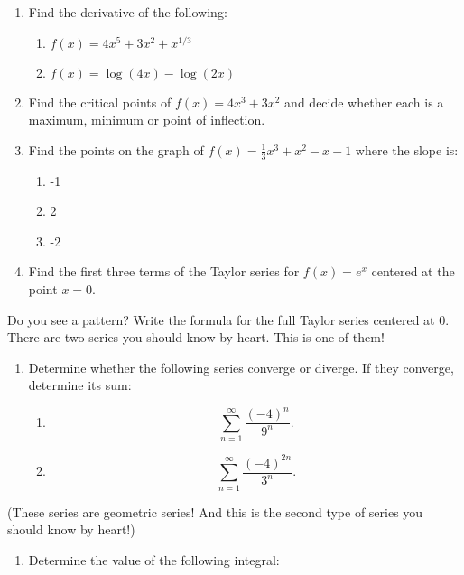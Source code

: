 \documentclass[
]{article}
\providecommand{\tightlist}{%
  \setlength{\itemsep}{0pt}\setlength{\parskip}{0pt}}
\begin{document}
\begin{enumerate}
\def\labelenumi{\arabic{enumi}.}
\item
  Find the derivative of the following:

  \begin{enumerate}
  \def\labelenumii{\alph{enumii}.}
  \tightlist
  \item
    \(f(x) = 4 x^5 + 3 x^2 + x^{1/3}\)
  \item
    \(f(x) = \log(4x) - \log(2x)\)
  \end{enumerate}
\item
  Find the critical points of \(f(x) = 4 x^3 + 3 x^2\) and decide whether each is a maximum, minimum or point of inflection.
\item
  Find the points on the graph of \(f(x) = \frac{1}{3} x^3 + x^2 - x - 1\) where the slope is:

  \begin{enumerate}
  \def\labelenumii{\alph{enumii}.}
  \tightlist
  \item
    -1
  \item
    2
  \item
    -2
  \end{enumerate}
\item
  Find the first three terms of the Taylor series for \(f(x) = e^x\) centered at the point \(x = 0\).
\end{enumerate}

Do you see a pattern? Write the formula for the full Taylor series centered at 0. There are two series you should know by heart. This is one of them!

\begin{enumerate}
\def\labelenumi{\arabic{enumi}.}
\setcounter{enumi}{4}
\item
  Determine whether the following series converge or diverge. If they converge, determine its sum:

  \begin{enumerate}
  \def\labelenumii{\alph{enumii}.}
  \tightlist
  \item
    \[\sum_{n = 1}^{\infty} \frac{(-4)^n}{9^n}.\]
  \item
    \[\sum_{n = 1}^{\infty} \frac{(-4)^{2n}}{3^n}.\]
  \end{enumerate}
\end{enumerate}

(These series are geometric series! And this is the second type of series you should know by heart!)

\begin{enumerate}
\def\labelenumi{\arabic{enumi}.}
\setcounter{enumi}{5}
\tightlist
\item
  Determine the value of the following integral:
\end{enumerate}
\end{document}
